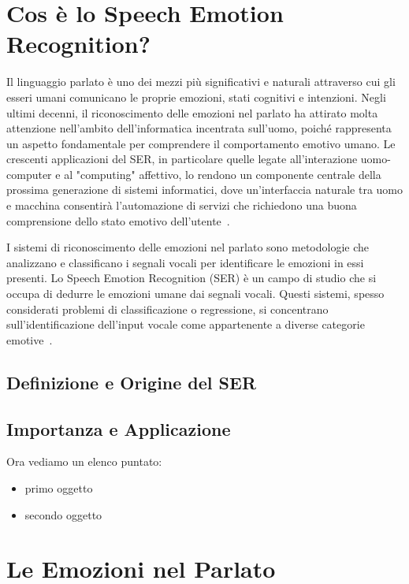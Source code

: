 \section{Cos è lo Speech Emotion Recognition?}

Il linguaggio parlato è uno dei mezzi più significativi e naturali attraverso cui gli esseri umani comunicano le proprie emozioni, stati cognitivi e intenzioni. Negli ultimi decenni, il riconoscimento delle emozioni nel parlato ha attirato molta attenzione nell'ambito dell'informatica incentrata sull'uomo, poiché rappresenta un aspetto fondamentale per comprendere il comportamento emotivo umano. Le crescenti applicazioni del SER, in particolare quelle legate all'interazione uomo-computer e al "computing" affettivo, lo rendono un componente centrale della prossima generazione di sistemi informatici, dove un'interfaccia naturale tra uomo e macchina consentirà l'automazione di servizi che richiedono una buona comprensione dello stato emotivo dell'utente~\cite{6913013}.

 I sistemi di riconoscimento delle emozioni nel parlato sono metodologie che analizzano e classificano i segnali vocali per identificare le emozioni in essi presenti. 
Lo Speech Emotion Recognition (SER) è un campo di studio che si occupa di dedurre le emozioni umane dai segnali vocali. Questi sistemi, spesso considerati problemi di classificazione o regressione, si concentrano sull'identificazione dell'input vocale come appartenente a diverse categorie emotive~\cite{GEORGE2024127015}.


\subsection{Definizione e Origine del SER}
\subsection{Importanza e Applicazione}
Ora vediamo un elenco puntato:
\begin{itemize}                         %
\item primo oggetto
\item secondo oggetto
\end{itemize}

\section{Le Emozioni nel Parlato} %

